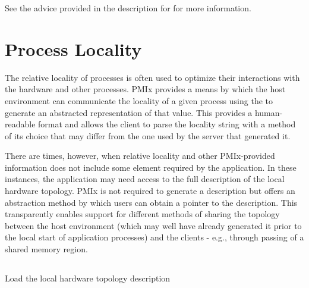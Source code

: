 See the advice provided in the description for  for more information.


\section{Process Locality}
\label{chap:api_proc_mgmt:locality}

The relative locality of processes is often used to optimize their interactions with the hardware and other processes. \ac{PMIx} provides a means by which the host environment can communicate the locality of a given process using the  to generate an abstracted representation of that value. This provides a human-readable format and allows the client to parse the locality string with a method of its choice that may differ from the one used by the server that generated it.

There are times, however, when relative locality and other \ac{PMIx}-provided
information does not include some element required by the application. In these
instances, the application may need access to the full description of the
local hardware topology. 
\ac{PMIx} is not required to generate a description but offers an abstraction 
method by which users can obtain a pointer to
the description. This transparently enables support for different methods of
sharing the topology between the host environment (which may well have already
generated it prior to the local start of application processes) and the clients -
e.g., through passing of a shared memory region.

\subsection{}

\summary

Load the local hardware topology description

\format


\begin{arglist}
\end{arglist}


